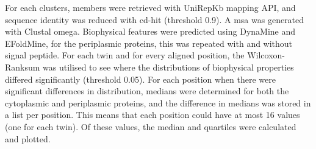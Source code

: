 For each clusters, members were retrieved with UniRepKb mapping API,
and sequence identity was reduced with cd-hit (threshold 0.9).
A msa was generated with Clustal omega.
Biophysical features were predicted using DynaMine and EFoldMine,
for the periplasmic proteins, this was repeated with and without signal peptide.
For each twin and for every aligned position, the Wilcoxon-Ranksum was utilised to see where the distributions of biophysical properties differed significantly (threshold 0.05).
For each position when there were significant differences in distribution, medians were determined for both the cytoplasmic and periplasmic proteins, and the difference in medians was stored in a list per position.
This means that each position could have at most 16 values (one for each twin).
Of these values, the median and quartiles were calculated and plotted.

